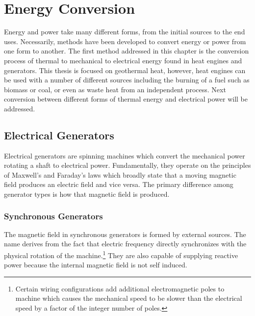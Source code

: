 \chapter{Energy Conversion}
\label{ch:conv}

Energy and power take many different forms, from the initial sources to the end uses. Necessarily, methods have been developed to convert energy or power from one form to another. The first method addressed in this chapter is the conversion process of thermal to mechanical to electrical energy found in heat engines and generators. This thesis is focused on geothermal heat, however, heat engines can be used with a number of different sources including the burning of a fuel such as biomass or coal, or even as waste heat from an independent process. Next conversion between different forms of thermal energy and electrical power will be addressed.



\section{Electrical Generators}
Electrical generators are spinning machines which convert the mechanical power rotating a shaft to electrical power. Fundamentally, they operate on the principles of Maxwell's and Faraday's laws which broadly state that a moving magnetic field produces an electric field and vice versa. The primary difference among generator types is how that magnetic field is produced. 

\subsection{Synchronous Generators}
The magnetic field in synchronous generators is formed by external sources. The name derives from the fact that electric frequency directly synchronizes with the physical rotation of the machine.\footnote{Certain wiring configurations add additional electromagnetic poles to machine which causes the mechanical speed to be slower than the electrical speed by a factor of the integer number of poles.} They are also capable of supplying reactive power because the internal magnetic field is not self induced. 

